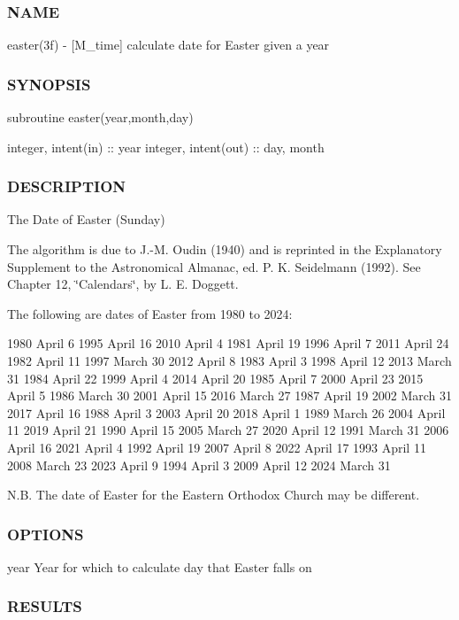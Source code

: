 \subsubsection*{N\+A\+ME}

easter(3f) -\/ \mbox{[}M\+\_\+time\mbox{]} calculate date for Easter given a year 

\subsubsection*{S\+Y\+N\+O\+P\+S\+IS}

subroutine easter(year,month,day)

integer, intent(in) \+:\+: year integer, intent(out) \+:\+: day, month

\subsubsection*{D\+E\+S\+C\+R\+I\+P\+T\+I\+ON}

The Date of Easter (Sunday)

The algorithm is due to J.-\/M. Oudin (1940) and is reprinted in the Explanatory Supplement to the Astronomical Almanac, ed. P. K. Seidelmann (1992). See Chapter 12, \char`\"{}\+Calendars\char`\"{}, by L. E. Doggett.

The following are dates of Easter from 1980 to 2024\+:

1980 April 6 1995 April 16 2010 April 4 1981 April 19 1996 April 7 2011 April 24 1982 April 11 1997 March 30 2012 April 8 1983 April 3 1998 April 12 2013 March 31 1984 April 22 1999 April 4 2014 April 20 1985 April 7 2000 April 23 2015 April 5 1986 March 30 2001 April 15 2016 March 27 1987 April 19 2002 March 31 2017 April 16 1988 April 3 2003 April 20 2018 April 1 1989 March 26 2004 April 11 2019 April 21 1990 April 15 2005 March 27 2020 April 12 1991 March 31 2006 April 16 2021 April 4 1992 April 19 2007 April 8 2022 April 17 1993 April 11 2008 March 23 2023 April 9 1994 April 3 2009 April 12 2024 March 31

N.\+B. The date of Easter for the Eastern Orthodox Church may be different.

\subsubsection*{O\+P\+T\+I\+O\+NS}

year Year for which to calculate day that Easter falls on \subsubsection*{R\+E\+S\+U\+L\+TS}

